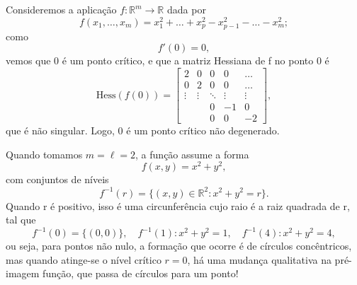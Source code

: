 \documentclass[../differential_topology.tex]{subfiles}
\begin{document}
\begin{example}
	Consideremos a aplicação \(f:\mathbb{R}^{m}\rightarrow \mathbb{R}\) dada por
	\[
		f(x_1, \dotsc , x_{m}) = x_{1}^{2} +\dotsc +x_{p}^{2} - x_{p-1}^{2} -\dotsc -x_{m}^{2};
	\]
	como
	\[
		f'(0) = 0,
	\]
	vemos que 0 é um ponto crítico, e que a matriz Hessiana de f no ponto 0 é
	\[
		\mathrm{Hess}(f(0)) = \begin{bmatrix}
			2      & 0      & 0      & 0      & \dotsc \\
			0      & 2      & 0      & 0      & \dotsc \\
			\vdots & \vdots & \ddots & \vdots & \vdots \\
			       &        & 0      & -1     & 0      \\
			       &        & 0      & 0      & -2
		\end{bmatrix},
	\]
	que é não singular. Logo, 0 é um ponto crítico não degenerado.

	Quando tomamos \(m=\ell =2\), a função assume a forma
	\[
		f(x, y) = x^{2} + y^{2},
	\]
	com conjuntos de níveis
	\[
		f^{-1}(r) = \{(x, y)\in \mathbb{R}^{2}: x^{2} + y^{2} = r\}.
	\]
	Quando r é positivo, isso é uma circunferência cujo raio é a raiz quadrada de r, tal que
	\[
		f^{-1}(0) = \{(0, 0)\},\quad  f^{-1}(1):x^{2} + y^{2} = 1, \quad f^{-1}(4): x^{2} + y^{2}=4,
	\]
	ou seja, para pontos não nulo, a formação que ocorre é de círculos concêntricos, mas quando atinge-se o nível crítico \(r = 0\), há uma mudança qualitativa na pré-imagem função, que passa de círculos para um ponto!
\end{example}
\end{document}
